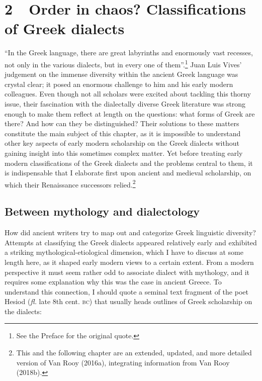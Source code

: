\clearpage\clearpage\section[2\ \ Order in chaos? Classifications of Greek dialects]{2\ \ Order in chaos? Classifications of Greek dialects}
\hypertarget{Toc19704806}{}\begin{styleStandard}
“In the Greek language, there are great labyrinths and enormously vast recesses, not only in the various dialects, but in every one of them”.\footnote{ See the Preface for the original quote.} Juan Luis Vives’ judgement on the immense diversity within the ancient Greek language was crystal clear; it posed an enormous challenge to him and his early modern colleagues. Even though not all scholars were excited about tackling this thorny issue, their fascination with the dialectally diverse Greek literature was strong enough to make them reflect at length on the questions: what forms of Greek are there? And how can they be distinguished? Their solutions to these matters constitute the main subject of this chapter, as it is impossible to understand other key aspects of early modern scholarship on the Greek dialects without gaining insight into this sometimes complex matter. Yet before treating early modern classifications of the Greek dialects and the problems central to them, it is indispensable that I elaborate first upon ancient and medieval scholarship, on which their Renaissance successors relied.\footnote{ This and the following chapter are an extended, updated, and more detailed version of Van Rooy (2016a), integrating information from Van Rooy (2018b).}
\end{styleStandard}

\subsection{Between mythology and dialectology}
\hypertarget{Toc19704807}{}\begin{styleStandard}
How did ancient writers try to map out and categorize Greek linguistic diversity? Attempts at classifying the Greek dialects appeared relatively early and exhibited a striking mythological-etiological dimension, which I have to discuss at some length here, as it shaped early modern views to a certain extent. From a modern perspective it must seem rather odd to associate dialect with mythology, and it requires some explanation why this was the case in ancient Greece. To understand this connection, I should quote a seminal text fragment of the poet Hesiod (\textit{fl.} late 8th cent. \textsc{bc}) that usually heads outlines of Greek scholarship on the dialects:
\end{styleStandard}

